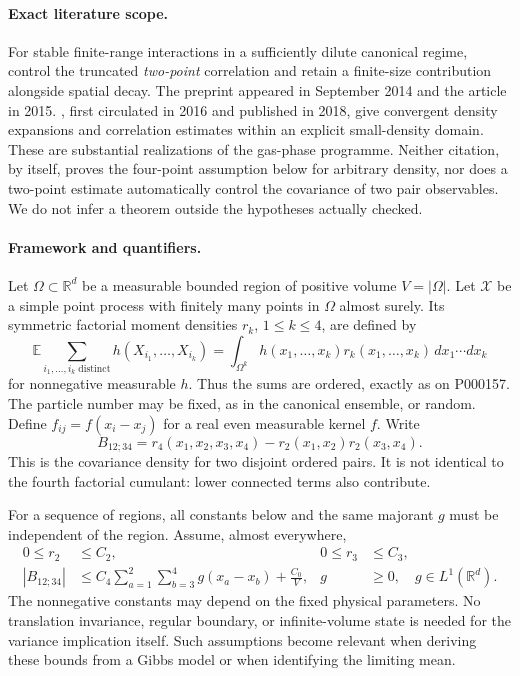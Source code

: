 \paragraph{Exact literature scope.}
For stable finite-range interactions in a sufficiently dilute canonical regime, \citet[Theorem~2.5 and Corollary~2.6]{pulvirentitsagkarogiannis2015finite} control the truncated \emph{two-point} correlation and retain a finite-size contribution alongside spatial decay. The preprint appeared in September 2014 and the article in 2015. \citet[Theorems~2.1 and 2.7]{kunatsagkarogiannis2018density}, first circulated in 2016 and published in 2018, give convergent density expansions and correlation estimates within an explicit small-density domain. These are substantial realizations of the gas-phase programme. Neither citation, by itself, proves the four-point assumption below for arbitrary density, nor does a two-point estimate automatically control the covariance of two pair observables. We do not infer a theorem outside the hypotheses actually checked.

\paragraph{Framework and quantifiers.}
Let \(\Omega\subset\mathbb R^d\) be a measurable bounded region of positive volume \(V=|\Omega|\). Let \(\mathcal X\) be a simple point process with finitely many points in \(\Omega\) almost surely. Its symmetric factorial moment densities \(r_k\), \(1\leq k\leq4\), are defined by
\[
 \mathbb E\!\sum_{i_1,\ldots,i_k\;\mathrm{distinct}}
 h(X_{i_1},\ldots,X_{i_k})
 =\int_{\Omega^k}h(x_1,\ldots,x_k)r_k(x_1,\ldots,x_k)\,dx_1\cdots dx_k
\]
for nonnegative measurable \(h\). Thus the sums are ordered, exactly as on P000157. The particle number may be fixed, as in the canonical ensemble, or random. Define \(f_{ij}=f(x_i-x_j)\) for a real even measurable kernel \(f\). Write
\[
 B_{12;34}=r_4(x_1,x_2,x_3,x_4)-r_2(x_1,x_2)r_2(x_3,x_4).
\]
This is the covariance density for two disjoint ordered pairs. It is not identical to the fourth factorial cumulant: lower connected terms also contribute.

For a sequence of regions, all constants below and the same majorant \(g\) must be independent of the region. Assume, almost everywhere,
\begin{align}
 0\leq r_2&\leq C_2,&0\leq r_3&\leq C_3,\label{eq:bounds23}\\
 |B_{12;34}|&\leq C_4\sum_{a=1}^2\sum_{b=3}^4g(x_a-x_b)+\frac{C_0}{V},
 &g&\geq0,\quad g\in L^1(\mathbb R^d).\label{eq:pairmix}
\end{align}
The nonnegative constants may depend on the fixed physical parameters. No translation invariance, regular boundary, or infinite-volume state is needed for the variance implication itself. Such assumptions become relevant when deriving these bounds from a Gibbs model or when identifying the limiting mean.

